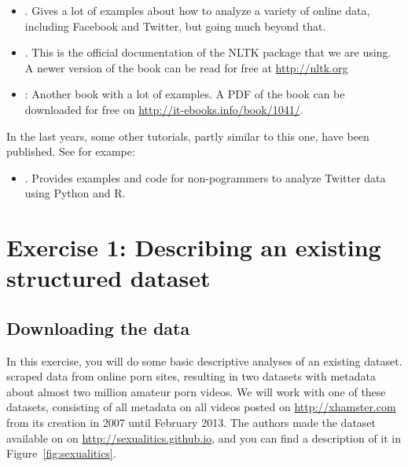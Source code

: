 \documentclass[a4paper,12pt]{book}
\begin{document}
\begin{itemize}
\item \citealp{Russel2013}. Gives a lot of examples about how to analyze a variety of online data, including Facebook and Twitter, but going much beyond that.
\item \citealp{Bird2009}. This is the official documentation of the NLTK package that we are using. A newer version of the book can be read for free at \url{http://nltk.org}
\item \citealp{McKinney2012}: Another book with a lot of examples. A PDF of the book can be downloaded for free on \url{http://it-ebooks.info/book/1041/}.
\end{itemize}

In the last years, some other tutorials, partly similar to this one, have been published. See for exampe:
\begin{itemize}
\item \citealp{Jurgens2016}. Provides examples and code for non-pogrammers to analyze Twitter data using Python and R.
\end{itemize}


\appendix

\chapter[Exercise 1]{Exercise 1: Describing an existing structured dataset}
\section{Downloading the data}
In this exercise, you will do some basic descriptive analyses of an existing dataset. \cite{mazieres2014} scraped data from online porn sites, resulting in two datasets with  metadata about almost two million amateur porn videos. We will work with one of these datasets, consisting of all metadata on all videos posted on \url{http://xhamster.com} from its creation in 2007 until February 2013. The authors made the dataset available on on \url{http://sexualitics.github.io}, and you can find a description of it in Figure~\ref{fig:sexualitics}.
\end{document}
